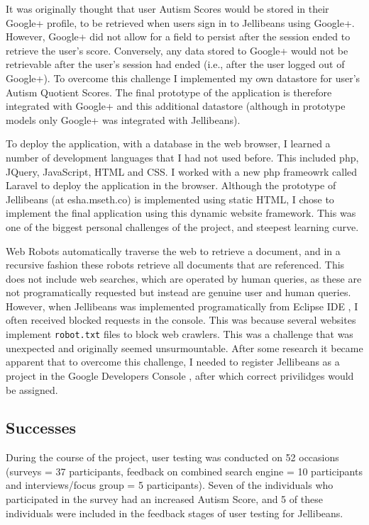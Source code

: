 \documentclass[a4paper, 11pt]{article}
\begin{document}
\vspace{5mm}
It was originally thought that user Autism Scores would be stored in their Google+ profile, to be retrieved when users sign in to Jellibeans using Google+. However, Google+ did not allow for a field to persist after the session ended to retrieve the user's score. Conversely, any data stored to Google+ would not be retrievable after the user's session had ended (i.e., after the user logged out of Google+). To overcome this challenge I implemented my own datastore for user's Autism Quotient Scores. The final prototype of the application is therefore integrated with Google+ and this additional datastore (although in prototype models only Google+ was integrated with Jellibeans).

\vspace{5mm}
To deploy the application, with a database in the web browser, I learned a number of development languages that I had not used before. This included php, JQuery, JavaScript, HTML and CSS. I worked with a new php frameowrk called Laravel\cite{laravel} to deploy the application in the browser. Although the prototype of Jellibeans (at esha.mseth.co) is implemented using static HTML, I chose to implement the final application using this dynamic website framework. This was one of the biggest personal challenges of the project, and steepest learning curve. 

\vspace{5mm}
Web Robots automatically traverse the web to retrieve a document, and in a recursive fashion these robots retrieve all documents that are referenced. This does not include web searches, which are operated by human queries, as these are not programatically requested but instead are genuine user and human queries. \\
However, when Jellibeans was implemented programatically from Eclipse IDE \cite{eclipse}, I often received blocked requests in the console. This was because several websites implement \texttt{robot.txt} files to block web crawlers. This was a challenge that was unexpected and originally seemed unsurmountable. After some research it became apparent that to overcome this challenge, I needed to register Jellibeans as a project in the Google Developers Console \cite{GDC}, after which correct privilidges would be assigned.

\subsection{Successes}
During the course of the project, user testing was conducted on 52 occasions (surveys = 37 participants, feedback on combined search engine = 10 participants and interviews/focus group = 5 participants). Seven of the individuals who participated in the survey had an increased Autism Score, and 5 of these individuals were included in the feedback stages of user testing for Jellibeans. 
\end{document}
